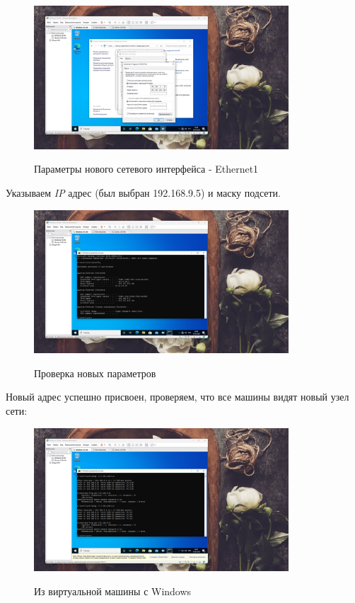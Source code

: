 \documentclass[a4paper]{article}
\begin{document}
  \begin{figure}[H]
    \centering
    \includegraphics[width=0.85\textwidth]{06_00 (67)}
    \label{img:67}
    \caption{Параметры нового сетевого интерфейса - Ethernet1}
  \end{figure}

  Указываем \textit{IP} адрес (был выбран 192.168.9.5) и маску подсети.
  
  \begin{figure}[H]
    \centering
    \includegraphics[width=0.85\textwidth]{06_00 (68)}
    \label{img:68}
    \caption{Проверка новых параметров}
  \end{figure}

  Новый адрес успешно присвоен, проверяем, что все машины видят новый узел сети:
  
  \begin{figure}[H]
    \centering
    \includegraphics[width=0.85\textwidth]{06_00 (69)}
    \label{img:69}
    \caption{Из виртуальной машины с Windows}
  \end{figure}
   
\end{document}
